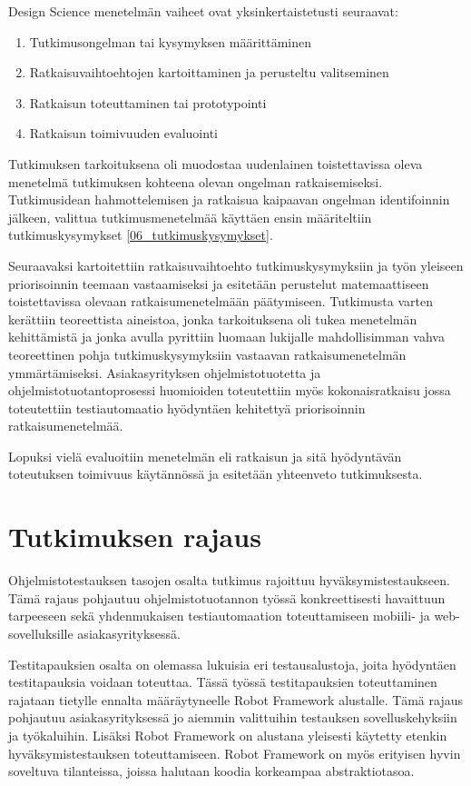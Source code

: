 Design Science menetelmän vaiheet ovat yksinkertaistetusti seuraavat:
\begin{enumerate}
  \item Tutkimusongelman tai kysymyksen määrittäminen
  \item Ratkaisuvaihtoehtojen kartoittaminen ja perusteltu valitseminen
  \item Ratkaisun toteuttaminen tai prototypointi
  \item Ratkaisun toimivuuden evaluointi
\end{enumerate}

Tutkimuksen tarkoituksena oli muodostaa uudenlainen toistettavissa oleva menetelmä tutkimuksen kohteena olevan ongelman ratkaisemiseksi.
Tutkimusidean hahmottelemisen ja ratkaisua kaipaavan ongelman identifoinnin jälkeen, valittua tutkimusmenetelmää käyttäen ensin määriteltiin tutkimuskysymykset \ref{06_tutkimuskysymykset}.

Seuraavaksi kartoitettiin ratkaisuvaihtoehto tutkimuskysymyksiin ja työn yleiseen priorisoinnin teemaan vastaamiseksi ja esitetään perustelut matemaattiseen toistettavissa olevaan ratkaisumenetelmään päätymiseen.
Tutkimusta varten kerättiin teoreettista aineistoa, jonka tarkoituksena oli tukea menetelmän kehittämistä ja jonka avulla pyrittiin luomaan lukijalle mahdollisimman vahva teoreettinen pohja tutkimuskysymyksiin vastaavan ratkaisumenetelmän ymmärtämiseksi.
Asiakasyrityksen ohjelmistotuotetta ja ohjelmistotuotantoprosessi huomioiden toteutettiin myös kokonaisratkaisu jossa toteutettiin testiautomaatio hyödyntäen kehitettyä priorisoinnin ratkaisumenetelmää.

Lopuksi vielä evaluoitiin menetelmän eli ratkaisun ja sitä hyödyntävän toteutuksen toimivuus käytännössä ja esitetään yhteenveto tutkimuksesta.

\section{Tutkimuksen rajaus} \label{06_tutkimuksen_rajaus}

Ohjelmistotestauksen tasojen osalta tutkimus rajoittuu hyväksymistestaukseen.
Tämä rajaus pohjautuu ohjelmistotuotannon työssä konkreettisesti havaittuun tarpeeseen sekä yhdenmukaisen testiautomaation toteuttamiseen mobiili- ja web-sovelluksille asiakasyrityksessä.

Testitapauksien osalta on olemassa lukuisia eri testausalustoja, joita hyödyntäen testitapauksia voidaan toteuttaa.
Tässä työssä testitapauksien toteuttaminen rajataan tietylle ennalta määräytyneelle Robot Framework alustalle.
Tämä rajaus pohjautuu asiakasyrityksessä jo aiemmin valittuihin testauksen sovelluskehyksiin ja työkaluihin.
Lisäksi Robot Framework on alustana yleisesti käytetty etenkin hyväksymistestauksen toteuttamiseen.
Robot Framework on myös erityisen hyvin soveltuva tilanteissa, joissa halutaan koodia korkeampaa abstraktiotasoa.

